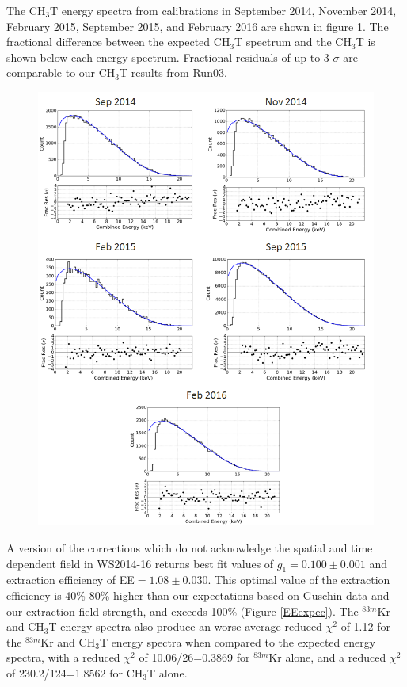 \documentclass[a4paper,10pt,twocolumn]{article}
\begin{document}
The CH$_3$T energy spectra from calibrations in September 2014, November 2014, February 2015, September 2015, and February 2016 are shown in figure \ref{Kr2p22_H3E}.  The fractional difference between the expected CH$_3$T spectrum and the CH$_3$T is shown below each energy spectrum.  Fractional residuals of up to 3 $\sigma$ are comparable to our CH$_3$T results from Run03.


\begin{figure}
\includegraphics[scale=0.4]{Run04Corrections/KrypCal_2p22_AllCH3TEnergy.png}
 \label{Kr2p22_H3E}
\end{figure}


A version of the corrections which do not acknowledge the spatial and time dependent field in WS2014-16 returns best fit values of $g_1=0.100 \pm 0.001$ and extraction efficiency of EE$=1.08 \pm 0.030$.  This optimal value of the extraction efficiency is 40\%-80\% higher than our expectations based on Guschin data and our extraction field strength, and exceeds 100\% (Figure \ref{EEexpec}).  The $^{83m}$Kr and CH$_3$T energy spectra also produce an worse average reduced $\chi^2$ of 1.12 for the $^{83m}$Kr and CH$_3$T energy spectra when compared to the expected energy spectra, with a reduced $\chi^2$ of 10.06/26=0.3869 for $^{83m}$Kr alone, and a reduced $\chi^2$ of 230.2/124=1.8562 for CH$_3$T alone. 
\end{document}
